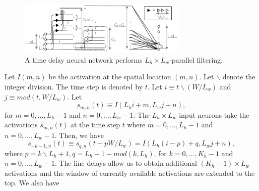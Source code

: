 \documentclass[journal]{IEEEtran}
\begin{document}
\begin{figure}[h]
\centering
\includegraphics[width = 3.2in]{./FIGURES/fig4.pdf}
\caption {A time delay neural network performs $L_h \times L_w$-parallel filtering. } \label{tdnn}
\end{figure} 
 Let $I(m,n)$ be the activation at the spatial location $(m,n)$. Let $\backslash$ denote the integer division. The time step is denoted by $t$. Let $i\equiv t\backslash(W/L_w)$ and $j\equiv mod(t,W/L_w)$.
Let
\begin{equation}
s_{m,n}(t) \equiv I(L_h i + m, L_w j + n),
\end{equation} 
 for $m=0,...,L_h-1$ and $n=0,...,L_w-1$. 
The $L_h\times L_w$ input neurons take the activations $s_{m,n}(t)$ at the time step $t$ where $m=0,...,L_h-1$ and $n=0,...,L_w-1$.  Then, we have
\begin{equation}
	s_{-k-1,n}(t) \equiv
	s_{q,n}(t-pW/L_w) = I\left(L_h(i-p)+q, L_w j+n\right),
\end{equation}
where $p=k\backslash L_h+1, q=L_h-1-mod(k,L_h)$, for $k=0, ..., K_h-1$ and $n=0,...,L_w-1$. 
The line delays allow us to obtain additional $(K_h-1)\times L_w$ activations and the window of currently available activations are extended to the top. We also have  
\end{document}
